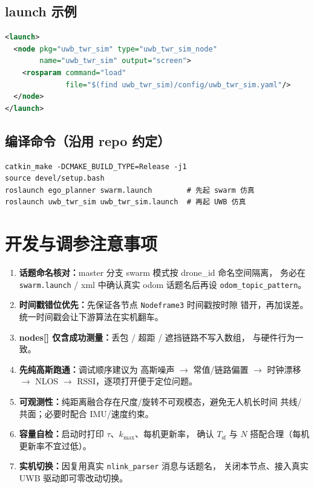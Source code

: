 \documentclass[11pt,a4paper]{article}
\begin{document}
\subsection{launch 示例}
\begin{lstlisting}[language=XML]
<launch>
  <node pkg="uwb_twr_sim" type="uwb_twr_sim_node"
        name="uwb_twr_sim" output="screen">
    <rosparam command="load"
              file="$(find uwb_twr_sim)/config/uwb_twr_sim.yaml"/>
  </node>
</launch>
\end{lstlisting}

\subsection{编译命令（沿用 repo 约定）}
\begin{lstlisting}
catkin_make -DCMAKE_BUILD_TYPE=Release -j1
source devel/setup.bash
roslaunch ego_planner swarm.launch        # 先起 swarm 仿真
roslaunch uwb_twr_sim uwb_twr_sim.launch  # 再起 UWB 仿真
\end{lstlisting}

\section{开发与调参注意事项}
\begin{enumerate}[leftmargin=1.6em]
  \item \textbf{话题命名核对：}master 分支 swarm 模式按 drone\_id 命名空间隔离，
        务必在 \texttt{swarm.launch} / xml 中确认真实 odom 话题名后再设
        \texttt{odom\_topic\_pattern}。
  \item \textbf{时间戳错位优先：}先保证各节点 \texttt{Nodeframe3} 时间戳按时隙
        错开，再加误差。统一时间戳会让下游算法在实机翻车。
  \item \textbf{nodes[] 仅含成功测量：}丢包 / 超距 / 遮挡链路不写入数组，
        与硬件行为一致。
  \item \textbf{先纯高斯跑通：}调试顺序建议为 高斯噪声 $\to$ 常值/链路偏置
        $\to$ 时钟漂移 $\to$ NLOS $\to$ RSSI，逐项打开便于定位问题。
  \item \textbf{可观测性：}纯距离融合存在尺度/旋转不可观模态，避免无人机长时间
        共线/共面；必要时配合 IMU/速度约束。
  \item \textbf{容量自检：}启动时打印 $\tau$、$k_{\max}$、每机更新率，
        确认 $T_{\text{sf}}$ 与 $N$ 搭配合理（每机更新率不宜过低）。
  \item \textbf{实机切换：}因复用真实 \texttt{nlink\_parser} 消息与话题名，
        关闭本节点、接入真实 UWB 驱动即可零改动切换。
\end{enumerate}
\end{document}
